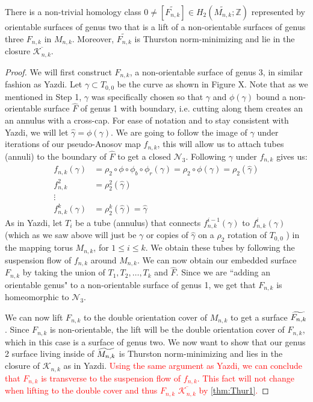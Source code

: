 \begin{lem}
\label{lem:genus3}
There is a non-trivial homology class $0 \neq [\widetilde{F_{n,k}}] \in H_2(\widetilde{M_{n,k}};\mathbb{Z})$ represented by orientable surfaces of genus two that is a lift of a non-orientable surfaces of genus three $F_{n,k}$ in $M_{n,k}$. Moreover, $\widetilde{F_{n,k}}$ is Thurston norm-minimizing and lie in the closure $\overline{\mathcal{K}_{n,k}}$.
\end{lem}
\begin{proof}
    We will first construct $F_{n,k}$, a non-orientable surface of genus 3, in  similar fashion as Yazdi. Let $\gamma \subset T_{0,0}$ be the curve as shown in Figure X. Note that as we mentioned in Step 1, $\gamma$ was specifically chosen so that $\gamma$ and $\phi(\gamma)$ bound a non-orientable surface $\hat{F}$ of genus 1 with boundary, i.e. cutting along them creates an an annulus with a cross-cap. For ease of notation and to stay consistent with Yazdi, we will let $\hat{\gamma} = \phi(\gamma)$. We are going to follow the image of $\gamma$ under iterations of our pseudo-Anosov map $f_{n,k}$, this will allow us to attach tubes (annuli) to the boundary of $\hat{F}$ to get a closed $\mathcal{N}_3$. Following $\gamma$ under $f_{n,k}$ gives us:
    \begin{align*}
        f_{n,k}(\gamma) &= \rho_2 \circ \phi \circ \phi_b \circ \phi_r(\gamma) = \rho_2 \circ \phi(\gamma) = \rho_2(\hat{\gamma}) \\
        f^2_{n,k} &= \rho_2^2(\hat{\gamma}) \\
        \vdots& \\
        f^k_{n,k}(\gamma) &= \rho_2^k(\hat{\gamma}) = \hat{\gamma}
    \end{align*}
    As in Yazdi, let $T_i$ be a tube (annulus) that connects $f_{n,k}^{i-1}(\gamma)$ to $f_{n,k}^i(\gamma)$ (which as we saw above will just be $\gamma$ or copies of $\hat{\gamma}$ on a $\rho_2$ rotation of $T_{0,0}$ ) in the mapping torus $M_{n,k}$, for $1 \leq i \leq k$. We obtain these tubes by following the suspension flow of $f_{n,k}$ around $M_{n,k}$. We can now obtain our embedded surface $F_{n,k}$ by taking the union of $T_1,T_2,\dots,T_k$ and $\hat{F}$. Since we are ``adding an orientable genus" to a non-orientable surface of genus 1, we get that $F_{n,k}$ is homeomorphic to $\mathcal{N}_3$.
    
    
    We can now lift $F_{n,k}$ to the double orientation cover of $M_{n,k}$ to get a surface $\widetilde{F_{n,k}}$. Since $F_{n,k}$ is non-orientable, the lift will be the double orientation cover of $F_{n,k}$, which in this case is a surface of genus two. We now want to show that our genus 2 surface living inside of $\widetilde{M_{n,k}}$ is Thurston norm-minimizing and lies in the closure of $\mathcal{K}_{n,k}$ as in Yazdi. \textcolor{red}{Using the same argument as Yazdi, we can conclude that $F_{n,k}$ is transverse to the suspension flow of $f_{n,k}$. This fact will not change when lifting to the double cover and thus $F_{n,k}$ \subset $\overline{\mathcal{K}_{n,k}}$ by \ref{thm:Thur1}.}
    

\end{proof}
